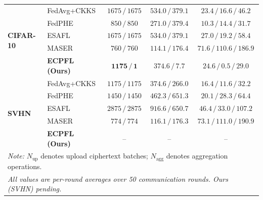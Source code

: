 \begin{table}[t]
{\begin{tabular}{ll c c c}
\multirow{5}{*}{\textbf{CIFAR-10}}
& FedAvg+CKKS & $1675 \,/\, 1675$ & $534.0 \,/\, 379.1$ & $23.4 \,/\, 16.6 \,/\, 46.2$ \\
& FedPHE      & $850 \,/\, 850$   & $271.0 \,/\, 379.4$ & $10.3 \,/\, 14.4 \,/\, 31.7$ \\
& ESAFL       & $1675 \,/\, 1675$ & $534.0 \,/\, 379.1$ & $27.0 \,/\, 19.2 \,/\, 58.4$ \\
& MASER       & $760 \,/\, 760$   & $114.1 \,/\, 176.4$ & $71.6 \,/\, 110.6 \,/\, 186.9$ \\
\rowcolor{gray!15}
& \textbf{ECPFL (Ours)} & $\mathbf{1175} \,/\, \mathbf{1}$ & $\mathbf{374.6} \,/\, \mathbf{7.7}$ & $\mathbf{24.6} \,/\, \mathbf{0.5} \,/\, \mathbf{29.0}$ \\
\midrule

\multirow{5}{*}{\textbf{SVHN}}
& FedAvg+CKKS & $1175 \,/\, 1175$ & $374.6 \,/\, 266.0$ & $16.4 \,/\, 11.6 \,/\, 32.2$ \\
& FedPHE      & $1450 \,/\, 1450$ & $462.3 \,/\, 651.3$ & $20.1 \,/\, 28.3 \,/\, 64.4$ \\
& ESAFL       & $2875 \,/\, 2875$ & $916.6 \,/\, 650.7$ & $46.4 \,/\, 33.0 \,/\, 107.2$ \\
& MASER       & $774 \,/\, 774$   & $116.1 \,/\, 176.3$ & $73.1 \,/\, 111.0 \,/\, 190.9$ \\
\rowcolor{gray!15}
& \textbf{ECPFL (Ours)} & -- & -- & -- \\

\bottomrule
\multicolumn{5}{l}{\scriptsize \textit{Note:} $N_{\mathrm{up}}$ denotes upload ciphertext batches; $N_{\mathrm{agg}}$ denotes aggregation operations.} \\
\multicolumn{5}{l}{\scriptsize \textit{All values are per-round averages over 50 communication rounds. Ours (SVHN) pending.}}
\end{tabular}
}
\end{table}
